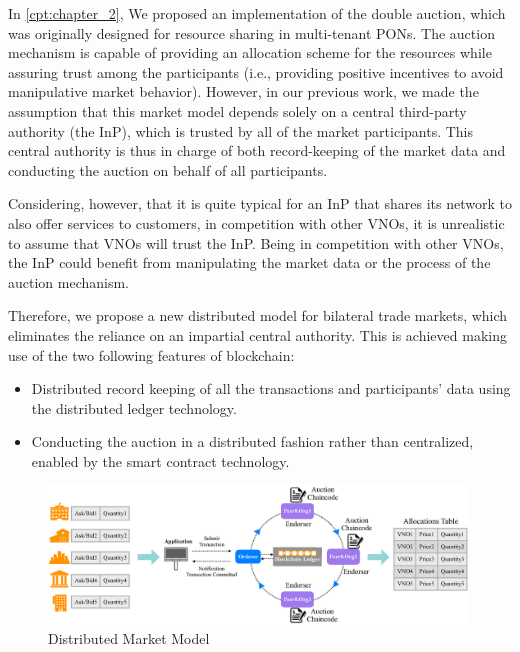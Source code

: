 In \autoref{cpt:chapter_2}, We proposed an implementation of the double auction, which was originally designed for resource sharing in multi-tenant \acp{PON}. The auction mechanism is capable of providing an allocation scheme for the resources while assuring trust among the participants (i.e., providing positive incentives to avoid manipulative market behavior). However, in our previous work, we made the assumption that this market model depends solely on a central third-party authority (the \ac{InP}), which is trusted by all of the market participants. This central authority is thus in charge of both record-keeping of the market data and conducting the auction on behalf of all participants.

Considering, however, that it is quite typical for an \ac{InP} that shares its network to also offer services to customers, in competition with other \acp{VNO}, it is unrealistic to assume that \acp{VNO} will trust the \ac{InP}. Being in competition with other \acp{VNO}, the \ac{InP} could benefit from manipulating the market data or the process of the auction mechanism. 

Therefore, we propose a new distributed model for bilateral trade markets, which eliminates the reliance on an impartial central authority. This is achieved making use of the two following features of blockchain:

\begin{itemize}
    \item Distributed record keeping of all the transactions and participants' data using the distributed ledger technology.
    \item Conducting the auction in a distributed fashion rather than centralized, enabled by the smart contract technology.
\end{itemize}

\begin{figure}
    \centering
    \includegraphics[width=0.99\textwidth]{Figures/figil.eps}
    \caption{Distributed Market Model}
    \label{fig:flow}
\end{figure}


